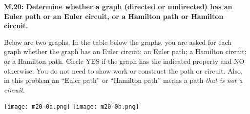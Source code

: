 \documentclass[11pt]{article}
\begin{document}
	
	\thispagestyle{empty}
	\renewcommand{\headrulewidth}{1pt}
	\thispagestyle{fancy}
	\lfoot{}
	\cfoot{}
	\rfoot{}	
	
	\vspace*{0in}

\noindent 
\textbf{M.20: Determine whether a graph (directed or undirected) has an Euler path or an Euler circuit, or a Hamilton path or Hamilton circuit.}

\bigskip

Below are two graphs. In the table below the graphs, you are asked for each graph whether the graph has an Euler circuit; an Euler path; a Hamilton circuit; or a Hamilton path. Circle YES if the graph has the indicated property and NO otherwise. You do not need to show work or construct the path or circuit. Also, in this problem an ``Euler path'' or ``Hamilton path'' means a path \emph{that is not a circuit}. 


		\begin{center}
			\texttt{[image: m20-0a.png]} \qquad 
			\texttt{[image: m20-0b.png]} 		
		\end{center}
\end{document}
